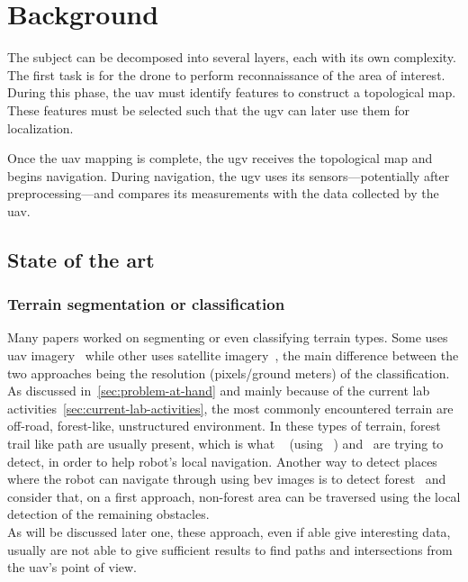 \chapter{Background}\label{ch:analysis}

The subject can be decomposed into several layers, each with its own complexity.
The first task is for the drone to perform reconnaissance of the area of interest.
During this phase, the \gls{uav} must identify features to construct a topological map.
These features must be selected such that the \gls{ugv} can later use them for localization.

Once the \gls{uav} mapping is complete, the \gls{ugv} receives the topological map and begins navigation.
During navigation, the \gls{ugv} uses its sensors—potentially after preprocessing—and compares its measurements with the data collected by the \gls{uav}.


\section{State of the art}\label{sec:state-of-the-art}


\subsection{Terrain segmentation or classification}

Many papers worked on segmenting or even classifying terrain types.
Some uses \gls{uav} imagery~\parencite{khan_visual_2012} while other uses satellite imagery~\parencite{sofman_terrain_2006},
the main difference between the two approaches being the resolution (pixels/ground meters) of the classification.
As discussed in~\ref{sec:problem-at-hand} and mainly because of the current lab activities~\ref{sec:current-lab-activities},
the most commonly encountered terrain are off-road, forest-like, unstructured environment.
In these types of terrain, forest trail like path are usually present, which is what ~\cite{rasmussen_appearance_2009} (using ~\cite{rufus_blas_fast_2008})
and~\cite{giusti_machine_2016} are trying to detect, in order to help robot's local navigation.
Another way to detect places where the robot can navigate through using \gls{bev} images is to detect forest~\parencite{bosch_journal_2020}
and consider that, on a first approach, non-forest area can be traversed using the local detection of the remaining obstacles.\\
As will be discussed later one, these approach, even if able give interesting data, usually are not able to give
sufficient results to find paths and intersections from the \gls{uav}'s point of view.

